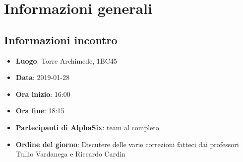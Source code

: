 \newcommand{\documento}{\VI}
\newcommand{\nomedocumentofisico}{VI\_2019-01-28.pdf}
\newcommand{\redazione}{\SG}
\newcommand{\verifica}{\TG}
\newcommand{\approvazione}{\LC}
\newcommand{\versione}{1.0.0}
\newcommand{\uso}{Interno}
\newcommand{\destinateTo}{\gruppo}
\newcommand{\datacreazione}{01 febbraio 2019}
\newcommand{\datamodifica}{03 febbraio 2019}
\newcommand{\stato}{Approvato}

\def\TABELLE{false}	%
\def\FIGURE{false} 	%






    

    	
    
    \section{Informazioni generali}
		\subsection{Informazioni incontro}
			\begin{itemize}
				\item { \textbf{Luogo}: Torre Archimede, 1BC45}
				\item {\textbf{Data}: 2019-01-28}
				\item {\textbf{Ora inizio}: 16:00}
				\item {\textbf{Ora fine}: 18:15}
				\item {\textbf{Partecipanti di AlphaSix}: team al completo}
				\item {\textbf{Ordine del giorno}: Discutere delle varie correzioni fatteci dai professori Tullio Vardanega e Riccardo Cardin}
			\end{itemize}

